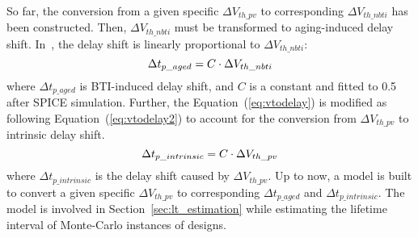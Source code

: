 So far, the conversion from a given specific $\Delta V_{th\_pv}$ to corresponding $\Delta V_{th\_nbti}$ has been constructed. Then, $\Delta V_{th\_nbti}$ must be transformed to aging-induced delay shift. In~\cite{wang2007efficient}, the delay shift is linearly proportional to $\Delta V_{th\_nbti}$:
\begin{equation}
	\centering
	\fontsize{9}{9} \selectfont
	\Delta t_{p\_aged} = C \cdot \Delta V_{th\_nbti}
	\label{eq:vtodelay}
\end{equation}	
where $\Delta t_{p\_aged}$ is BTI-induced delay shift, and $C$ is a constant and fitted to 0.5 after SPICE simulation. Further, the Equation~(\ref{eq:vtodelay}) is modified as following Equation~(\ref{eq:vtodelay2}) to account for the conversion from $\Delta V_{th\_pv}$ to intrinsic delay shift. 
\begin{equation}
	\centering
	\fontsize{9}{9} \selectfont
	\Delta t_{p\_intrinsic} = C \cdot \Delta V_{th\_pv}
	\label{eq:vtodelay2}
\end{equation}	
where $\Delta t_{p\_intrinsic}$ is the delay shift caused by $\Delta V_{th\_pv}$. Up to now, a model is built to convert a given specific $\Delta V_{th\_pv}$ to corresponding $\Delta t_{p\_aged}$ and $\Delta t_{p\_intrinsic}$. The model is involved in Section~\ref{sec:lt_estimation} while estimating the lifetime interval of Monte-Carlo instances of designs. 

